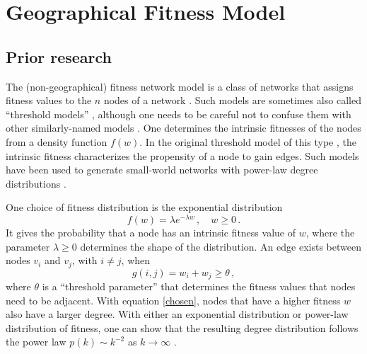 \documentclass[%
 reprint,
 amsmath,amssymb,
 aps,
]{revtex4-1}
\begin{document}



\section{Geographical Fitness Model} \label{sec:fitness_model}

\subsection{Prior research}

The (non-geographical) fitness network model is a class of networks that assigns fitness values to the $n$ nodes of a network \cite{yusuke}. Such models are sometimes also called ``threshold models'' \cite{geographical_threshold}, although one needs to be careful not to confuse them with other similarly-named models \cite{newman2018}. One determines the intrinsic fitnesses of the nodes from a density function $f(w)$. In the original threshold model of this type \cite{caldarelli}, the intrinsic fitness characterizes the propensity of a node to gain edges. Such models have been used to generate small-world networks with power-law degree distributions \cite{geographical_threshold}.

One choice of fitness distribution is the exponential distribution
\begin{equation}\label{exponentialfitness}
    f(w) = \lambda e^{-\lambda w}\,, \quad w \geq 0\,.
\end{equation}
It gives the probability that a node has an intrinsic fitness value of $w$, where the parameter $\lambda \geq 0$ determines the shape of the distribution. An edge exists between nodes $v_i$ and $v_j$, with $i \neq j$, when 
\begin{equation} \label{chosen}
    g(i,j) = w_i + w_j \geq \theta \,,
\end{equation}
where $\theta$ is a ``threshold parameter'' that determines the fitness values that nodes need to be adjacent. With equation \eqref{chosen}, nodes that have a higher fitness $w$ also have a larger degree. With either an exponential distribution or power-law distribution of fitness, one can show that the resulting degree distribution follows the power law $p(k) \sim k^{-2}$ as $k \rightarrow \infty$ \cite{caldarelli, threshold}.
\end{document}
